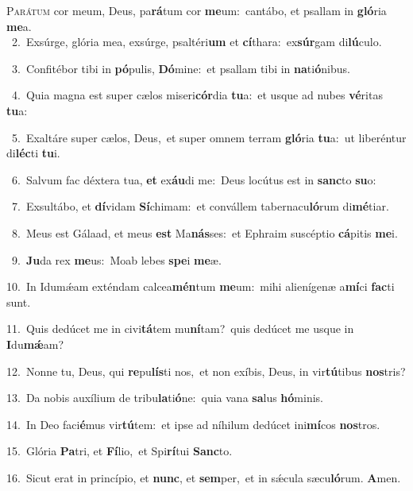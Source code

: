 \lettrine{\initial\textcolor{\initialcolor}{P}}{arátum} cor meum, Deus, pa\-\textbf{rá}\-tum cor \textbf{me}\-um:~\star cantábo, et psallam in \textbf{gló}\-ria \textbf{me}\-a.\\
{\numbfont\textcolor{\numbcolor}{~2.}}~Exsúrge, glória mea, exsúrge, psaltéri\textbf{um} et \textbf{cí}\-thara:~\star ex\-\textbf{súr}\-gam di\-\textbf{lú}\-culo.\par
{\numbfont\textcolor{\numbcolor}{~3.}}~Confitébor tibi in \textbf{pó}\-pulis, \textbf{Dó}\-mine:~\star et psallam tibi in \textbf{na}\-ti\-\textbf{ó}\-nibus.\par
{\numbfont\textcolor{\numbcolor}{~4.}}~Quia magna est super cælos miseri\-\textbf{cór}\-dia \textbf{tu}\-a:~\star et usque ad nubes \textbf{vé}\-ritas \textbf{tu}\-a:\par
{\numbfont\textcolor{\numbcolor}{~5.}}~Exaltáre super cælos, Deus,~\dagger et super omnem terram \textbf{gló}\-ria \textbf{tu}\-a:~\star ut liberéntur di\-\textbf{léc}\-ti \textbf{tu}\-i.\par
{\numbfont\textcolor{\numbcolor}{~6.}}~Salvum fac déxtera tua, \textbf{et} ex\-\textbf{áu}\-di me:~\star Deus locútus est in \textbf{sanc}\-to \textbf{su}\-o:\par
{\numbfont\textcolor{\numbcolor}{~7.}}~Exsultábo, et \textbf{dí}\-vidam \textbf{Sí}\-chimam:~\star et convállem tabernacu\-\textbf{ló}\-rum di\-\textbf{mé}\-tiar.\par
{\numbfont\textcolor{\numbcolor}{~8.}}~Meus est Gálaad, et meus \textbf{est} Ma\-\textbf{nás}\-ses:~\star et Ephraim suscéptio \textbf{cá}\-pitis \textbf{me}\-i.\par
{\numbfont\textcolor{\numbcolor}{~9.}}~\-\textbf{Ju}\-da rex \textbf{me}\-us:~\star Moab lebes \textbf{spe}\-i \textbf{me}\-æ.\par
{\numbfont\textcolor{\numbcolor}{10.}}~In Idumǽam exténdam calcea\-\textbf{mén}\-tum \textbf{me}\-um:~\star mihi alienígenæ a\-\textbf{mí}\-ci \textbf{fac}\-ti sunt.\par
{\numbfont\textcolor{\numbcolor}{11.}}~Quis dedúcet me in civi\-\textbf{tá}\-tem mu\-\textbf{ní}\-tam?~\star quis dedúcet me usque in \textbf{I}\-du\-\textbf{mǽ}\-am?\par
{\numbfont\textcolor{\numbcolor}{12.}}~Nonne tu, Deus, qui \textbf{re}\-pu\-\textbf{lís}\-ti nos,~\star et non exíbis, Deus, in vir\-\textbf{tú}\-tibus \textbf{nos}\-tris?\par
{\numbfont\textcolor{\numbcolor}{13.}}~Da nobis auxílium de tribu\-\textbf{la}\-ti\-\textbf{ó}\-ne:~\star quia vana \textbf{sa}\-lus \textbf{hó}\-minis.\par
{\numbfont\textcolor{\numbcolor}{14.}}~In Deo faci\-\textbf{é}\-mus vir\-\textbf{tú}\-tem:~\star et ipse ad níhilum dedúcet ini\-\textbf{mí}\-cos \textbf{nos}\-tros.\par
{\numbfont\textcolor{\numbcolor}{15.}}~Glória \textbf{Pa}\-tri, et \textbf{Fí}\-lio,~\star et Spi\-\textbf{rí}\-tui \textbf{Sanc}\-to.\par
{\numbfont\textcolor{\numbcolor}{16.}}~Sicut erat in princípio, et \textbf{nunc}\-, et \textbf{sem}\-per,~\star et in sǽcula sæcu\-\textbf{ló}\-rum. \textbf{A}\-men.\par
